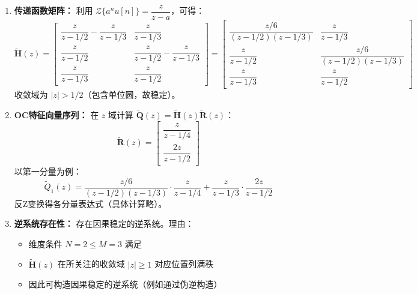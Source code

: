 \begin{example}[离散时间OC变换综合题]
\begin{enumerate}
        \item \textbf{传递函数矩阵：}
              利用 $\mathcal{Z}\{a^n u[n]\} = \dfrac{z}{z-a}$，可得：
              \begin{equation}
                  \tilde{\mathbf{H}}(z) = \begin{bmatrix}
                      \dfrac{z}{z-1/2} - \dfrac{z}{z-1/3} & \dfrac{z}{z-1/3}                    \\
                      \dfrac{z}{z-1/2}                    & \dfrac{z}{z-1/2} - \dfrac{z}{z-1/3} \\
                      \dfrac{z}{z-1/3}                    & \dfrac{z}{z-1/2}
                  \end{bmatrix}
                  = \begin{bmatrix}
                      \dfrac{z/6}{(z-1/2)(z-1/3)} & \dfrac{z}{z-1/3}            \\
                      \dfrac{z}{z-1/2}            & \dfrac{z/6}{(z-1/2)(z-1/3)} \\
                      \dfrac{z}{z-1/3}            & \dfrac{z}{z-1/2}
                  \end{bmatrix}
              \end{equation}
              收敛域为 $|z| > 1/2$（包含单位圆，故稳定）。

        \item \textbf{OC特征向量序列：}
              在 $z$ 域计算 $\tilde{\mathbf{Q}}(z) = \tilde{\mathbf{H}}(z)\tilde{\mathbf{R}}(z)$：
              \begin{equation}
                  \tilde{\mathbf{R}}(z) = \begin{bmatrix}
                      \dfrac{z}{z-1/4} \\ \dfrac{2z}{z-1/2}
                  \end{bmatrix}
              \end{equation}
              以第一分量为例：
              \begin{equation}
                  \tilde{Q}_1(z) = \dfrac{z/6}{(z-1/2)(z-1/3)}\cdot\dfrac{z}{z-1/4} + \dfrac{z}{z-1/3}\cdot\dfrac{2z}{z-1/2}
              \end{equation}
              反Z变换得各分量表达式（具体计算略）。

        \item \textbf{逆系统存在性：} 存在因果稳定的逆系统。理由：
              \begin{itemize}
                  \item 维度条件 $N=2 \leq M=3$ 满足
                  \item $\tilde{\mathbf{H}}(z)$ 在所关注的收敛域 $|z|\geq 1$ 对应位置列满秩
                  \item 因此可构造因果稳定的逆系统（例如通过伪逆构造）
              \end{itemize}


\end{enumerate}
\end{example}
